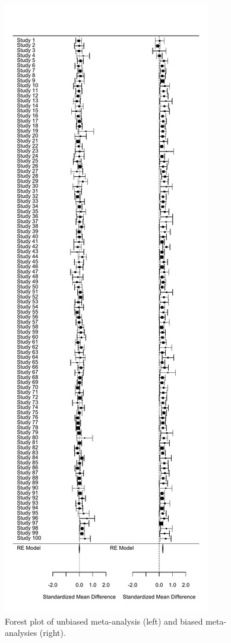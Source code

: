 \documentclass[
  oneside]{book}
\begin{document}
\begin{figure}

{\centering \includegraphics[width=1\linewidth]{12-bias_files/figure-latex/twoforestplot-1} 

}

\caption{Forest plot of unbiased meta-analysis (left) and biased meta-analysies (right).}\label{fig:twoforestplot}
\end{figure}
\end{document}
